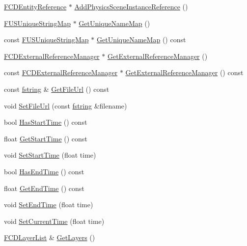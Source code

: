\begin{DoxyCompactItemize}
\item 
\hyperlink{classFCDEntityReference}{FCDEntityReference} $\ast$ \hyperlink{classFCDocument_a5e839e7a2e5ae27569ac15374f562092}{AddPhysicsSceneInstanceReference} ()
\item 
\hyperlink{classFUUniqueStringMapT}{FUSUniqueStringMap} $\ast$ \hyperlink{classFCDocument_a51087f2b7e207acd9b91593a17a03ece}{GetUniqueNameMap} ()
\item 
const \hyperlink{classFUUniqueStringMapT}{FUSUniqueStringMap} $\ast$ \hyperlink{classFCDocument_a744ec07e076dd3d407cf86cab133d9da}{GetUniqueNameMap} () const 
\item 
\hyperlink{classFCDExternalReferenceManager}{FCDExternalReferenceManager} $\ast$ \hyperlink{classFCDocument_a317f4254028b6c0ce703e3bd49f06fea}{GetExternalReferenceManager} ()
\item 
const \hyperlink{classFCDExternalReferenceManager}{FCDExternalReferenceManager} $\ast$ \hyperlink{classFCDocument_a1b96b021dc3c2d21c4dbed72c42c6528}{GetExternalReferenceManager} () const 
\item 
const \hyperlink{classfm_1_1stringT}{fstring} \& \hyperlink{classFCDocument_acc3e16673efda723e522fa96251c35d3}{GetFileUrl} () const 
\item 
void \hyperlink{classFCDocument_ac4c9db1a38aa296d3a490bf0c5fb9b68}{SetFileUrl} (const \hyperlink{classfm_1_1stringT}{fstring} \&filename)
\item 
bool \hyperlink{classFCDocument_aa0d660d457f7cee9697153c953376b34}{HasStartTime} () const 
\item 
float \hyperlink{classFCDocument_aa3464ee0cd90d36fa21be0138d9130ac}{GetStartTime} () const 
\item 
void \hyperlink{classFCDocument_a2d645ebb0804a98b029f5385fbed4811}{SetStartTime} (float time)
\item 
bool \hyperlink{classFCDocument_ad6cb1ce5f04d20850096cf698c12d354}{HasEndTime} () const 
\item 
float \hyperlink{classFCDocument_a9527edd3502a061aed734aedd4b32db9}{GetEndTime} () const 
\item 
void \hyperlink{classFCDocument_a8227ef2951a30bc86843d178cddfb9ab}{SetEndTime} (float time)
\item 
void \hyperlink{classFCDocument_abc57dcb28da6aff43efa144e11a6fc32}{SetCurrentTime} (float time)
\item 
\hyperlink{classfm_1_1pvector}{FCDLayerList} \& \hyperlink{classFCDocument_a4da787bc275a485f677aba9238cebbfc}{GetLayers} ()
\item 

\end{DoxyCompactItemize}
